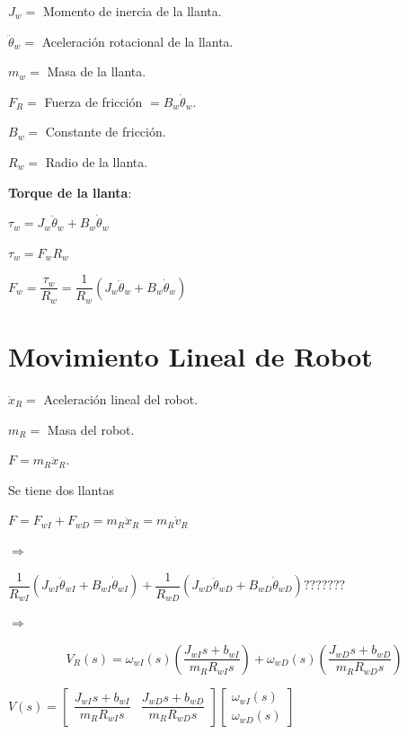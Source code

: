 
$J_{w} = $ Momento de inercia de la llanta.

$\ddot{\theta}_{w} = $ Aceleración rotacional de la llanta.

$m_{w} = $ Masa de la llanta.

$F_{R} = $ Fuerza de fricción $= B_{w} \dot{\theta}_{w}$.

$B_{w} = $ Constante de fricción.

$R_{w} = $ Radio de la llanta.



\textbf{Torque de la llanta}:


$\tau_{w} = J_{w}\ddot{\theta}_{w} + B_{w}\dot{\theta}_{w}$

$\tau_{w} = F_{w}R_{w}$

$F_{w} = \dfrac{\tau_{w}}{R_{w}} = \dfrac{1}{R_{w}}\left( J_{w}\ddot{\theta}_{w} + B_{w}\dot{\theta}_{w} \right)$ 




\section{Movimiento Lineal de Robot}

$\ddot{x}_{R} = $ Aceleración lineal del robot.

$m_{R} = $ Masa del robot.

$F = m_{R}\ddot{x}_{R}$.

Se tiene dos llantas

$F = F_{wI} + F_{wD} = m_{R}\ddot{x}_{R} = m_{R}\dot{v}_{R}$

$\Rightarrow$

$\dfrac{1}{R_{wI}} \left( J_{wI}\ddot{\theta}_{wI} + B_{wI}\dot{\theta}_{wI}\right) + \dfrac{1}{R_{wD}} \left( J_{wD}\ddot{\theta}_{wD} + B_{wD}\dot{\theta}_{wD}\right)???????$

$\Rightarrow$


$$V_{R}(s) = \omega_{wI}(s)\left( \dfrac{J_{wI}s + b_{wI}}{m_{R}R_{wI}s} \right) + \omega_{wD}(s)\left( \dfrac{J_{wD}s + b_{wD}}{m_{R}R_{wD}s} \right)$$

$
V(s) = \begin{bmatrix}
\dfrac{J_{wI}s + b_{wI}}{m_{R}R_{wI}s} & \dfrac{J_{wD}s + b_{wD}}{m_{R}R_{wD}s}  
\end{bmatrix} \begin{bmatrix}
 \omega_{wI}(s) \\
 \omega_{wD}(s)  
\end{bmatrix}
$


